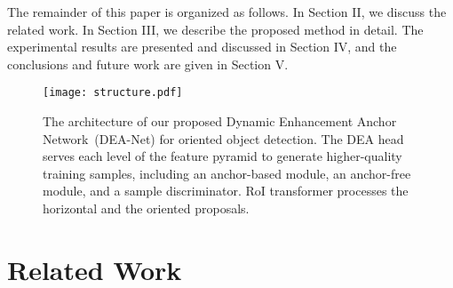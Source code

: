 \documentclass[journal]{IEEEtran}
\begin{document}
The remainder of this paper is organized as follows. In Section II, we discuss the related work. In Section III, we describe the proposed method in detail. The experimental results are presented and discussed in Section IV, and the conclusions and future work are given in Section V.

\begin{figure}
	\centering
	\texttt{[image: structure.pdf]}
	\caption{The architecture of our proposed Dynamic Enhancement Anchor Network~(DEA-Net) for oriented object detection. The DEA head serves each level of the feature pyramid to generate higher-quality training samples, including an anchor-based module, an anchor-free module, and a sample discriminator. RoI transformer \cite{ding2019learning} processes the horizontal and the oriented proposals.}
	\label{structure}
\end{figure}
\section{Related Work}
\end{document}
